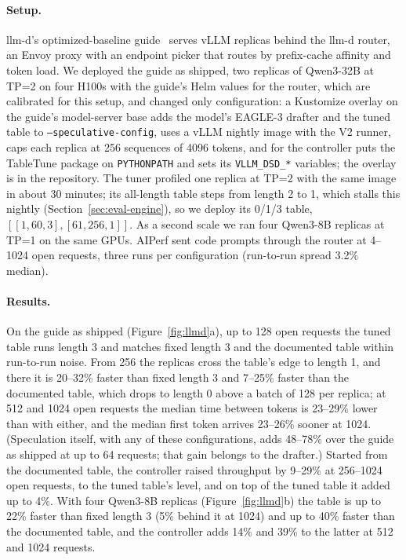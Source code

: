 \documentclass{article}
\newcommand{\sys}{TableTune}
\begin{document}
\paragraph{Setup.} llm-d's optimized-baseline guide~\cite{llmd} serves vLLM replicas behind the llm-d router, an Envoy proxy with an endpoint picker that routes by prefix-cache affinity and token load. We deployed the guide as shipped, two replicas of Qwen3-32B at TP=2 on four H100s with the guide's Helm values for the router, which are calibrated for this setup, and changed only configuration: a Kustomize overlay on the guide's model-server base adds the model's EAGLE-3 drafter and the tuned table to \texttt{--speculative-config}, uses a vLLM nightly image with the V2 runner, caps each replica at 256 sequences of 4096 tokens, and for the controller puts the \sys{} package on \texttt{PYTHONPATH} and sets its \texttt{VLLM\_DSD\_*} variables; the overlay is in the repository. The tuner profiled one replica at TP=2 with the same image in about 30 minutes; its all-length table steps from length 2 to 1, which stalls this nightly (Section~\ref{sec:eval-engine}), so we deploy its 0/1/3 table, $[[1,60,3],[61,256,1]]$. As a second scale we ran four Qwen3-8B replicas at TP=1 on the same GPUs. AIPerf sent code prompts through the router at 4--1024 open requests, three runs per configuration (run-to-run spread 3.2\% median).

\paragraph{Results.} On the guide as shipped (Figure~\ref{fig:llmd}a), up to 128 open requests the tuned table runs length 3 and matches fixed length 3 and the documented table within run-to-run noise. From 256 the replicas cross the table's edge to length 1, and there it is 20--32\% faster than fixed length 3 and 7--25\% faster than the documented table, which drops to length 0 above a batch of 128 per replica; at 512 and 1024 open requests the median time between tokens is 23--29\% lower than with either, and the median first token arrives 23--26\% sooner at 1024. (Speculation itself, with any of these configurations, adds 48--78\% over the guide as shipped at up to 64 requests; that gain belongs to the drafter.) Started from the documented table, the controller raised throughput by 9--29\% at 256--1024 open requests, to the tuned table's level, and on top of the tuned table it added up to 4\%. With four Qwen3-8B replicas (Figure~\ref{fig:llmd}b) the table is up to 22\% faster than fixed length 3 (5\% behind it at 1024) and up to 40\% faster than the documented table, and the controller adds 14\% and 39\% to the latter at 512 and 1024 requests.
\end{document}
